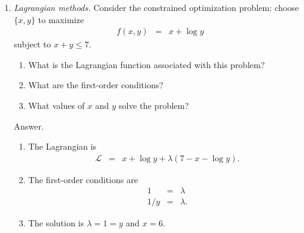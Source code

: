 \begin{enumerate}
\item {\it Lagrangian methods.\/}
Consider the constrained optimization problem:  choose $\{x,y\}$
to maximize
\begin{eqnarray*}
    f(x,y) &=& x + \log y
\end{eqnarray*}
subject to $ x + y \leq 7$.
%
\begin{enumerate}
\item What is the Lagrangian function associated with this problem?
\item What are the first-order conditions?
\item What values of $x$ and $y$ solve the problem?
\end{enumerate}
%
Answer.
\begin{enumerate}
\item The Lagrangian is
\begin{eqnarray*}
    \mathcal{L} &=& x + \log y  + \lambda (7 - x - \log y ).
\end{eqnarray*}
\item The first-order conditions are
\begin{eqnarray*}
    1 &=& \lambda \\
    1/y &=& \lambda .
\end{eqnarray*}
\item The solution is $\lambda = 1 = y$ and $x = 6$.
\end{enumerate}


\end{enumerate}
